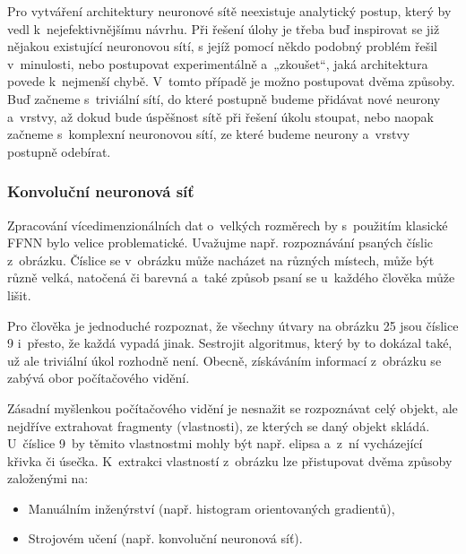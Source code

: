 \documentclass[a4paper,12pt]{article}
\begin{document}
{{

Pro vytváření architektury neuronové sítě neexistuje analytický postup, který by vedl k~nejefektivnějšímu návrhu. Při řešení úlohy je třeba buď inspirovat se již nějakou existující neuronovou sítí, s jejíž pomocí někdo podobný problém řešil v~minulosti, nebo postupovat experimentálně a~„zkoušet“, jaká architektura povede k~nejmenší chybě. V~tomto případě je možno postupovat dvěma způsoby. Buď začneme s~triviální sítí, do které postupně budeme přidávat nové neurony a~vrstvy, až dokud bude úspěšnost sítě při řešení úkolu stoupat, nebo naopak začneme s~komplexní neuronovou sítí, ze které budeme neurony a~vrstvy postupně odebírat.~\cite{nn}

\subsubsection{Konvoluční neuronová síť}

Zpracování vícedimenzionálních dat o~velkých rozměrech by s~použitím klasické FFNN bylo velice problematické. Uvažujme např. rozpoznávání psaných číslic z~obrázku. Číslice se v~obrázku může nacházet na různých místech, může být různě velká, natočená či barevná a~také způsob psaní se u~každého člověka může lišit.


Pro člověka je jednoduché rozpoznat, že všechny útvary na obrázku 25 jsou číslice 9 i~přesto, že každá vypadá jinak. Sestrojit algoritmus, který by to dokázal také, už ale triviální úkol rozhodně není. Obecně, získáváním informací z~obrázku se zabývá obor počítačového vidění.~\cite{convnn}

Zásadní myšlenkou počítačového vidění je nesnažit se rozpoznávat celý objekt, ale nejdříve extrahovat fragmenty (vlastnosti), ze kterých se daný objekt skládá. U~číslice 9~by těmito vlastnostmi mohly být např. elipsa a~z~ní vycházející křivka či úsečka. K~extrakci vlastností z~obrázku lze přistupovat dvěma způsoby založenými na:

\begin{itemize}
\item Manuálním inženýrství (např. histogram orientovaných gradientů),
\item Strojovém učení (např. konvoluční neuronová síť).~\cite{convnn}
\end{itemize}

}}
\end{document}
